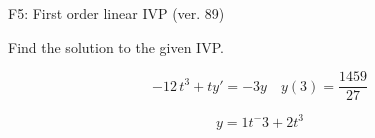 \begin{exercise}
  \begin{exerciseTitle}F5: First order linear IVP (ver. 89)\end{exerciseTitle}
  \begin{exerciseStatement}
    
Find the solution to the given IVP.

    
\[-12 \, t^{3} +ty'= -3 y \hspace{1em} y( 3 ) = \frac{1459}{27}\]

  \end{exerciseStatement}
  \begin{exerciseAnswer}
    
\[y= 1 t^ -3 +2 t^{3}\]

  \end{exerciseAnswer}
\end{exercise}